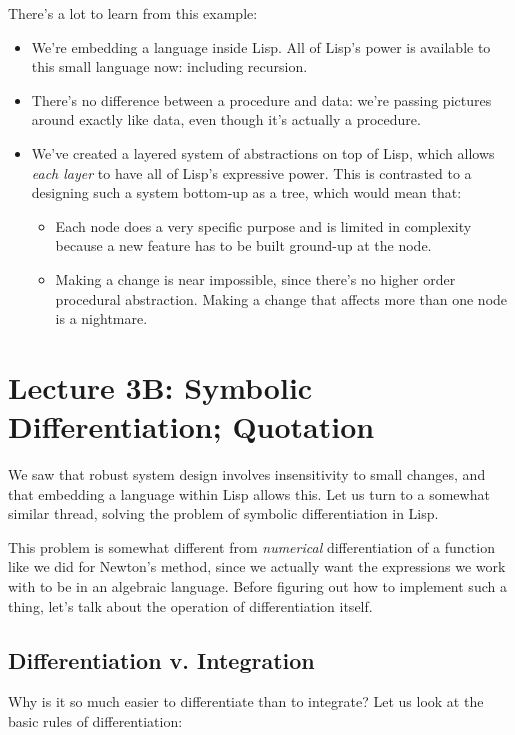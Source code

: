 \documentclass[9pt]{report}
\begin{document}
There's a lot to learn from this example:
\begin{itemize}
\item We're embedding a language inside Lisp. All of Lisp's power is
available to this small language now: including recursion.
\item There's no difference between a procedure and data: we're
passing pictures around exactly like data, even though it's
actually a procedure.
\item We've created a layered system of abstractions on top of Lisp,
which allows \emph{each layer} to have all of Lisp's expressive
power. This is contrasted to a designing such a system bottom-up
as a tree, which would mean that:
\begin{itemize}
\item Each node does a very specific purpose and is limited in
complexity because a new feature has to be built ground-up at
the node.
\item Making a change is near impossible, since there's no higher
order procedural abstraction. Making a change that affects
more than one node is a nightmare.
\end{itemize}
\end{itemize}

\chapter{Lecture 3B: Symbolic Differentiation; Quotation}
\label{sec:orgdd8dc9a}

We saw that robust system design involves insensitivity to small
changes, and that embedding a language within Lisp allows this. Let
us turn to a somewhat similar thread, solving the problem of
symbolic differentiation in Lisp.

This problem is somewhat different from \emph{numerical} differentiation
of a function like we did for Newton's method, since we actually
want the expressions we work with to be in an algebraic language.
Before figuring out how to implement such a thing, let's talk about
the operation of differentiation itself.

\section{Differentiation v. Integration}
\label{sec:org80ade53}

Why is it so much easier to differentiate than to integrate?
Let us look at the basic rules of differentiation:
\end{document}
